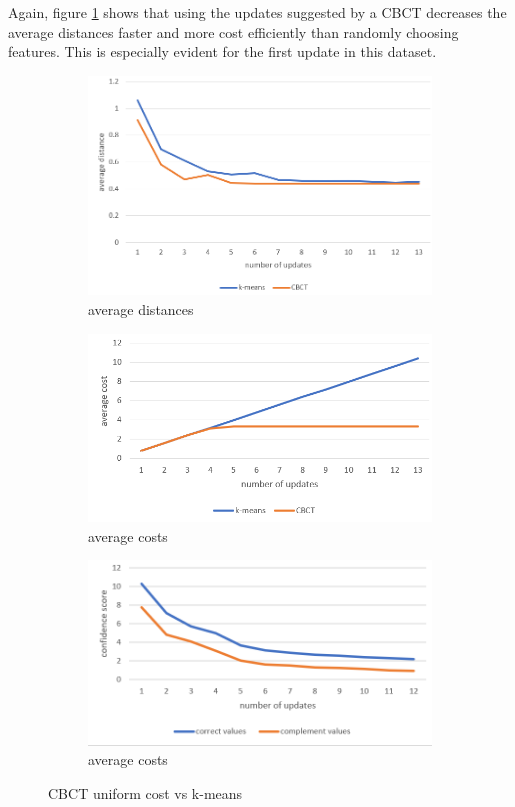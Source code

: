 \documentclass[conference]{IEEEtran}
\begin{document}
Again, figure \ref{fig3} shows that using the updates suggested by a
CBCT decreases the average distances faster and more cost efficiently than
randomly choosing features. This is especially evident for the first update
in this dataset.
\begin{figure}[H]
		\centering
		\begin{subfigure}[b]{0.4\linewidth}
			\includegraphics[width=\linewidth]{img08}
			\caption{average distances}
		\end{subfigure}
		\begin{subfigure}[b]{0.4\linewidth}
			\includegraphics[width=\linewidth]{img09}
			\caption{average costs}
		\end{subfigure}
		\begin{subfigure}[b]{0.4\linewidth}
			\includegraphics[width=\linewidth]{img10}
			\caption{average costs}
		\end{subfigure}
		\caption{CBCT uniform cost vs k-means}
		\label{fig3}
\end{figure}
\end{document}
